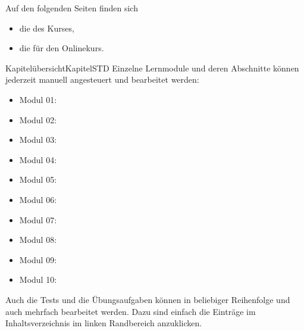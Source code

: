 \ifttm
\MSetSubject{\MINTPhysics}

\begin{MSectionStart}
Auf den folgenden Seiten finden sich
\begin{itemize}
\item{die  des Kurses,}
\item{die  für den Onlinekurs.}
\end{itemize}
\end{MSectionStart}


\begin{MXContent}{Kapitelübersicht}{Kapitel}{STD}
\MGlobalChapterTag
Einzelne Lernmodule und deren Abschnitte können jederzeit manuell angesteuert und bearbeitet werden:
\begin{itemize}
\item{Modul 01: }
\item{Modul 02: }
\item{Modul 03: }
\item{Modul 04: }
\item{Modul 05: }
\item{Modul 06: }
\item{Modul 07: }
\item{Modul 08: }
\item{Modul 09: }
\item{Modul 10: }
\end{itemize}
Auch die Tests und die Übungsaufgaben können in beliebiger Reihenfolge und auch mehrfach bearbeitet werden.
Dazu sind einfach die Einträge im Inhaltsverzeichnis im linken Randbereich anzuklicken.
\end{MXContent}


